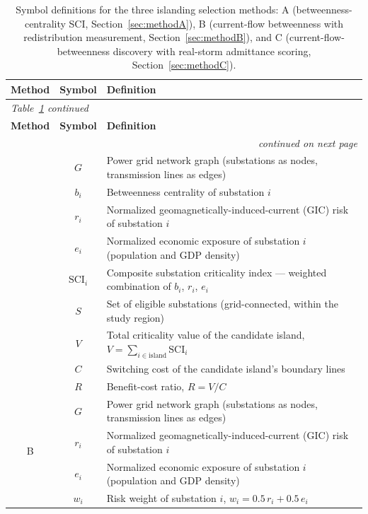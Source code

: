\documentclass[draft]{agujournal2019}
\begin{document}
\begingroup
\footnotesize
\begin{longtable}{c c p{9.5cm}}
\caption{Symbol definitions for the three islanding selection methods: A (betweenness-centrality SCI, Section~\ref{sec:methodA}), B (current-flow betweenness with redistribution measurement, Section~\ref{sec:methodB}), and C (current-flow-betweenness discovery with real-storm admittance scoring, Section~\ref{sec:methodC}).}
\label{tab:islanding-legends}\\
\toprule
\textbf{Method} & \textbf{Symbol} & \textbf{Definition} \\
\midrule
\endfirsthead
\multicolumn{3}{l}{\textit{Table~\ref{tab:islanding-legends} continued}} \\
\toprule
\textbf{Method} & \textbf{Symbol} & \textbf{Definition} \\
\midrule
\endhead
\midrule
\multicolumn{3}{r}{\textit{continued on next page}} \\
\endfoot
\bottomrule
\endlastfoot
\multirow{9}{*}{A} & $G$ & Power grid network graph (substations as nodes, transmission lines as edges) \\
 & $b_i$ & Betweenness centrality of substation $i$ \\
 & $r_i$ & Normalized geomagnetically-induced-current (GIC) risk of substation $i$ \\
 & $e_i$ & Normalized economic exposure of substation $i$ (population and GDP density) \\
 & $\text{SCI}_i$ & Composite substation criticality index --- weighted combination of $b_i$, $r_i$, $e_i$ \\
 & $S$ & Set of eligible substations (grid-connected, within the study region) \\
 & $V$ & Total criticality value of the candidate island, $V = \sum_{i \in \text{island}} \text{SCI}_i$ \\
 & $C$ & Switching cost of the candidate island's boundary lines \\
 & $R$ & Benefit-cost ratio, $R = V / C$ \\
\midrule
\multirow{10}{*}{B} & $G$ & Power grid network graph (substations as nodes, transmission lines as edges) \\
 & $r_i$ & Normalized geomagnetically-induced-current (GIC) risk of substation $i$ \\
 & $e_i$ & Normalized economic exposure of substation $i$ (population and GDP density) \\
 & $w_i$ & Risk weight of substation $i$, $w_i = 0.5\,r_i + 0.5\,e_i$ \\

\end{longtable}
\end{document}
